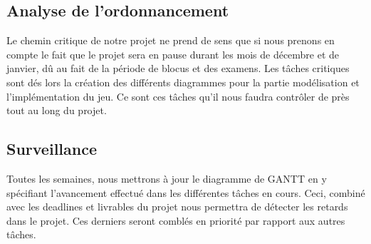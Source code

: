 \documentclass[]{article}
\begin{document}
\newpage
\subsection{Analyse de l'ordonnancement}

Le chemin critique de notre projet ne prend de sens que si nous prenons en compte le fait que le projet sera en pause durant les mois de décembre et de janvier, dû au fait de la période de blocus et des examens. Les tâches critiques sont dés lors la création des différents diagrammes pour la partie modélisation et l'implémentation du jeu. Ce sont ces tâches qu'il nous faudra contrôler de près tout au long du projet.
\subsection{Surveillance}

Toutes les semaines, nous mettrons à jour le diagramme de GANTT en y spécifiant l'avancement effectué dans les différentes tâches en cours. Ceci, combiné avec les deadlines et livrables du projet nous permettra de détecter les retards dans le projet. Ces derniers seront comblés en priorité par rapport aux autres tâches.
\end{document}
